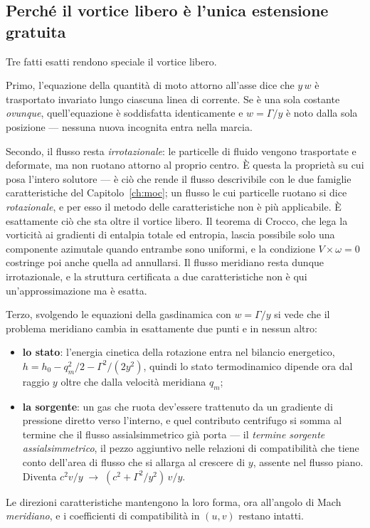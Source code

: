 \subsection{Perché il vortice libero è l'unica estensione gratuita}

Tre fatti esatti rendono speciale il vortice libero.

Primo, l'equazione della quantità di moto attorno all'asse dice che
$y\,w$ è trasportato invariato lungo ciascuna linea di corrente. Se è
una sola costante \emph{ovunque}, quell'equazione è soddisfatta
identicamente e $w = \Gamma/y$ è noto dalla sola posizione ---
nessuna nuova incognita entra nella marcia.

Secondo, il flusso resta \emph{irrotazionale}: le particelle di
fluido vengono trasportate e deformate, ma non ruotano attorno al
proprio centro. È questa la proprietà su cui posa l'intero solutore
--- è ciò che rende il flusso descrivibile con le due famiglie
caratteristiche del Capitolo~\ref{ch:moc}; un flusso le cui
particelle ruotano si dice \emph{rotazionale}, e per esso il metodo
delle caratteristiche non è più applicabile. È esattamente ciò che
sta oltre il vortice libero. Il teorema di Crocco, che lega la
vorticità ai gradienti di entalpia totale ed entropia, lascia
possibile solo una componente azimutale quando entrambe sono
uniformi, e la condizione $V \times \omega = 0$ costringe poi anche
quella ad annullarsi. Il flusso meridiano resta dunque irrotazionale,
e la struttura certificata a due caratteristiche non è qui
un'approssimazione ma è esatta.

Terzo, svolgendo le equazioni della gasdinamica con $w = \Gamma/y$ si
vede che il problema meridiano cambia in esattamente due punti e in
nessun altro:
\begin{itemize}[itemsep=1pt]
\item \textbf{lo stato}: l'energia cinetica della rotazione entra nel
  bilancio energetico, $h = h_0 - q_m^2/2 - \Gamma^2/(2y^2)$, quindi
  lo stato termodinamico dipende ora dal raggio $y$ oltre che dalla
  velocità meridiana $q_m$;
\item \textbf{la sorgente}: un gas che ruota dev'essere trattenuto da
  un gradiente di pressione diretto verso l'interno, e quel
  contributo centrifugo si somma al termine che il flusso
  assialsimmetrico già porta --- il \emph{termine sorgente
  assialsimmetrico}, il pezzo aggiuntivo nelle relazioni di
  compatibilità che tiene conto dell'area di flusso che si allarga al
  crescere di $y$, assente nel flusso piano. Diventa
  $c^2 v/y \;\to\; (c^2 + \Gamma^2/y^2)\,v/y$.
\end{itemize}
Le direzioni caratteristiche mantengono la loro forma, ora
all'angolo di Mach \emph{meridiano}, e i coefficienti di
compatibilità in $(u, v)$ restano intatti.

